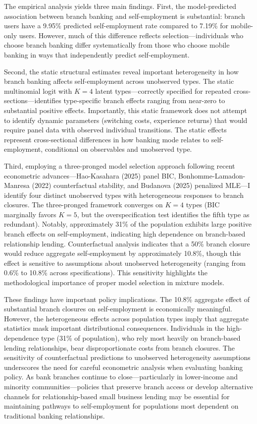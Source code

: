 \documentclass[12pt]{article}
\begin{document}
The empirical analysis yields three main findings. First, the model-predicted association between branch banking and self-employment is substantial: branch users have a 9.95\% predicted self-employment rate compared to 7.19\% for mobile-only users. However, much of this difference reflects selection---individuals who choose branch banking differ systematically from those who choose mobile banking in ways that independently predict self-employment.

Second, the static structural estimates reveal important heterogeneity in how branch banking affects self-employment across unobserved types. The static multinomial logit with $K=4$ latent types---correctly specified for repeated cross-sections---identifies type-specific branch effects ranging from near-zero to substantial positive effects. Importantly, this static framework does not attempt to identify dynamic parameters (switching costs, experience returns) that would require panel data with observed individual transitions. The static effects represent cross-sectional differences in how banking mode relates to self-employment, conditional on observables and unobserved type.

Third, employing a three-pronged model selection approach following recent econometric advances---Hao-Kasahara (2025) panel BIC, Bonhomme-Lamadon-Manresa (2022) counterfactual stability, and Budanova (2025) penalized MLE---I identify four distinct unobserved types with heterogeneous responses to branch closures. The three-pronged framework converges on $K=4$ types (BIC marginally favors $K=5$, but the overspecification test identifies the fifth type as redundant). Notably, approximately 31\% of the population exhibits large positive branch effects on self-employment, indicating high dependence on branch-based relationship lending. Counterfactual analysis indicates that a 50\% branch closure would reduce aggregate self-employment by approximately 10.8\%, though this effect is sensitive to assumptions about unobserved heterogeneity (ranging from 0.6\% to 10.8\% across specifications). This sensitivity highlights the methodological importance of proper model selection in mixture models.

These findings have important policy implications. The 10.8\% aggregate effect of substantial branch closures on self-employment is economically meaningful. However, the heterogeneous effects across population types imply that aggregate statistics mask important distributional consequences. Individuals in the high-dependence type (31\% of population), who rely most heavily on branch-based lending relationships, bear disproportionate costs from branch closures. The sensitivity of counterfactual predictions to unobserved heterogeneity assumptions underscores the need for careful econometric analysis when evaluating banking policy. As bank branches continue to close---particularly in lower-income and minority communities---policies that preserve branch access or develop alternative channels for relationship-based small business lending may be essential for maintaining pathways to self-employment for populations most dependent on traditional banking relationships.
\end{document}
